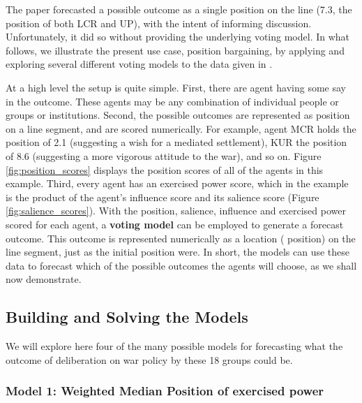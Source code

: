  The  paper \cite{mesquita_1984}  forecasted a possible outcome as a single   {position} on the line (7.3, the   {position} of both LCR and UP), with the intent of informing discussion. Unfortunately, it did so without providing the underlying voting model. In what follows, we illustrate the present use case, position bargaining, by applying and exploring several different voting models to the data given in  \cite{mesquita_1984}.



  At a high level the setup is quite simple. First, there are   {agent} having some say in the   {outcome}. These agents may be any combination of individual people or groups or institutions. Second, the possible outcomes are represented as   {position} on a line segment, and are scored numerically.  For example, agent MCR holds the   {position} of 2.1 (suggesting a wish for a mediated settlement), KUR the   {position} of 8.6 (suggesting a more vigorous attitude to the war), and so on. Figure \ref{fig:position_scores}  displays the   {position} scores of all of the agents in this example. Third, 
  every agent has an   {exercised power} score, which in the \cite{mesquita_1984} example is the product of the agent's   {influence} score and its   {salience} score (Figure \ref{fig:salience_scores}). With the   {position},   {salience},   {influence} and   {exercised power} scored for each agent, 
  a {\bf  {voting model}} can be employed to generate a forecast   {outcome}. This   {outcome} is represented numerically as a location (  {position}) on the line segment, just as the initial   {position} were.  In short, the models can use these data to  forecast which of the possible outcomes the agents will choose, as we shall now demonstrate.








\subsection{Building and Solving the Models}

We will explore here four of the many possible models for forecasting what the outcome of deliberation on war policy by these 18 groups could be.

\subsubsection{Model 1: Weighted Median Position of   {exercised power}\label{sec:weighted_median_exercised_power}}

